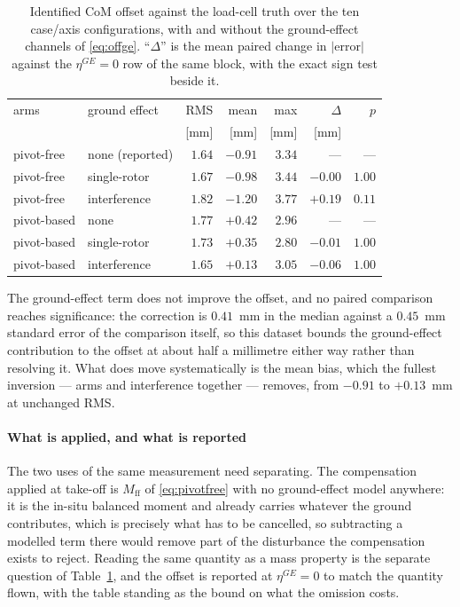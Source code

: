 \begin{table}[t]
\centering
\caption{Identified CoM offset against the load-cell truth over the
ten case/axis configurations, with and without the ground-effect
channels of \eqref{eq:offge}. ``$\Delta$'' is the mean paired change
in $|$error$|$ against the $\eta^{GE} = 0$ row of the same block, with
the exact sign test beside it.}
\label{tab:offge}
\small
\setlength{\tabcolsep}{4pt}
\begin{tabular}{@{}ll rrr rr@{}}
\hline
arms & ground effect & RMS & mean & max & $\Delta$ & $p$ \\
 & & [mm] & [mm] & [mm] & [mm] & \\
\hline
pivot-free & none (reported) & $1.64$ & $-0.91$ & $3.34$ & --- & --- \\
pivot-free & single-rotor & $1.67$ & $-0.98$ & $3.44$ & $-0.00$ & $1.00$ \\
pivot-free & interference & $1.82$ & $-1.20$ & $3.77$ & $+0.19$ & $0.11$ \\
\hline
pivot-based & none & $1.77$ & $+0.42$ & $2.96$ & --- & --- \\
pivot-based & single-rotor & $1.73$ & $+0.35$ & $2.80$ & $-0.01$ & $1.00$ \\
pivot-based & interference & $1.65$ & $+0.13$ & $3.05$ & $-0.06$ & $1.00$ \\
\hline
\end{tabular}
\end{table}

The ground-effect term does not improve the offset, and no paired
comparison reaches significance: the correction is $0.41$~mm in the
median against a $0.45$~mm standard error of the comparison itself, so
this dataset bounds the ground-effect contribution to the offset at
about half a millimetre either way rather than resolving it. What does
move systematically is the mean bias, which the fullest inversion ---
arms and interference together --- removes, from $-0.91$ to
$+0.13$~mm at unchanged RMS.

\paragraph{What is applied, and what is reported}
The two uses of the same measurement need separating. The compensation
applied at take-off is $M_{\mathrm{ff}}$ of \eqref{eq:pivotfree} with
no ground-effect model anywhere: it is the in-situ balanced moment and
already carries whatever the ground contributes, which is precisely
what has to be cancelled, so subtracting a modelled term there would
remove part of the disturbance the compensation exists to reject.
Reading the same quantity as a mass property is the separate question
of Table~\ref{tab:offge}, and the offset is reported at
$\eta^{GE} = 0$ to match the quantity flown, with the table standing
as the bound on what the omission costs.


